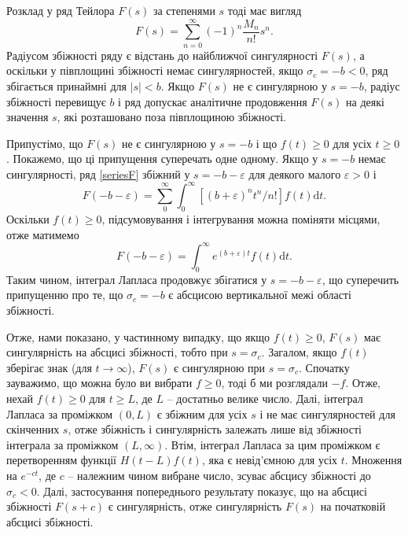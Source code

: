 \documentclass[14pt,twoside]{extreport}
\theoremstyle{mystyle}
\numberwithin{equation}{chapter}
\begin{document}
Розклад у ряд Тейлора $F(s)$ за степенями $s$ тоді має вигляд
\begin{equation}\label{seriesF}
	\displaystyle F(s)=\sum_{n=0}^{\infty}(-1)^{n}\dfrac{M_{n}}{n!}s^{n}.
\end{equation}
Радіусом збіжності ряду є відстань до найближчої сингулярності $F(s)$, а оскільки у півплощині збіжності немає сингулярностей, якщо $\sigma_{c}=-b<0$, ряд збігається принаймні для $|s|<b$. Якщо $F(s)$ не є сингулярною у $s=-b$, радіус збіжності перевищує $b$ і ряд допускає аналітичне продовження $F(s)$ на деякі значення $s$, які розташовано поза півплощиною збіжності.

Припустімо, що $F(s)$ не є сингулярною у $s=-b$ і що $f(t)\geqslant 0$ для усіх $t\geqslant 0$. Покажемо, що ці припущення суперечать одне одному. Якщо у $s=-b$ немає сингулярності, ряд \eqref{seriesF} збіжний у $ s=-b-\varepsilon$ для деякого малого $\varepsilon>0$ і
\begin{equation*}
	\displaystyle F(-b-\varepsilon)=\sum_{0}^{\infty}\int_{0}^{\infty}[(b+\varepsilon)^{n}t^{n}/n!]f(t)\mathrm{d}t.
\end{equation*}
Оскільки $f(t)\geqslant 0$, підсумовування і інтегрування можна поміняти місцями, отже матимемо
\begin{equation*}
	\displaystyle F(-b-\varepsilon)=\int_{0}^{\infty}e^{(b+\varepsilon)t}f(t)\mathrm{d}t.
\end{equation*}
Таким чином, інтеграл Лапласа продовжує збігатися у $s=-b-\varepsilon$, що суперечить припущенню про те, що $\sigma_{c}=-b$ є абсцисою вертикальної межі області збіжності.

Отже, нами показано, у частинному випадку, що якщо $f(t)\geqslant 0$, $F(s)$ має сингулярність на абсцисі збіжності, тобто при $s=\sigma_{c}$. Загалом, якщо $f(t)$ зберігає знак (для $t\to \infty$), $F(s)$ є сингулярною при $s=\sigma_{c}$. Спочатку зауважимо, що можна було ви вибрати $f\geqslant 0$, тоді б ми розглядали $-f$. Отже, нехай $f(t)\geqslant 0$ для $t\geqslant L$, де $L$ -- достатньо велике число. Далі, інтеграл Лапласа за проміжком $(0, L)$ є збіжним для усіх $s$ і не має сингулярностей для скінченних $s$, отже збіжність і сингулярність залежать лише від збіжності інтеграла за проміжком $(L, \infty)$. Втім, інтеграл Лапласа за цим проміжком є перетворенням функції $H(t-L)f(t)$, яка є невід'ємною для усіх $t$. Множення на $e^{-ct}$, де $c$ -- належним чином вибране число, зсуває абсцису збіжності до $\sigma_{c}<0$. Далі, застосування попереднього результату показує, що на абсцисі збіжності $F(s+c)$ є сингулярність, отже сингулярність $F(s)$ на початковій абсцисі збіжності.
\end{document}

